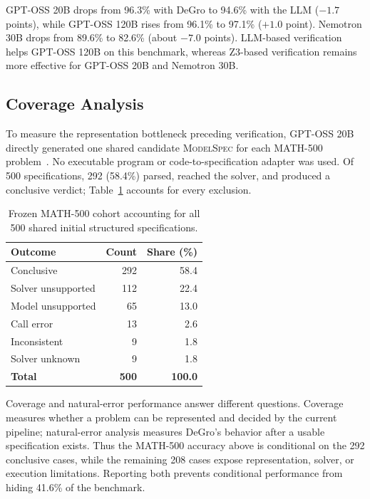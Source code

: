 \documentclass[sigconf,anonymous]{aamas}
\begin{document}
GPT-OSS 20B drops from 96.3\% with DeGro to 94.6\% with the LLM ($-1.7$ points), while GPT-OSS 120B rises from 96.1\% to 97.1\% ($+1.0$ point). Nemotron 30B drops from 89.6\% to 82.6\% (about $-7.0$ points). LLM-based verification helps GPT-OSS 120B on this benchmark, whereas Z3-based verification remains more effective for GPT-OSS 20B and Nemotron 30B.

\subsection{Coverage Analysis}\label{sec:coverage}
To measure the representation bottleneck preceding verification, GPT-OSS 20B directly generated one shared candidate \textsc{ModelSpec} for each MATH-500 problem~\cite{hendrycks2021math}.  No executable program or code-to-specification adapter was used.  Of 500 specifications, 292 (58.4\%) parsed, reached the solver, and produced a conclusive verdict; Table~\ref{tab:coverage} accounts for every exclusion.

\begin{table}[t]
\centering
\caption{Frozen MATH-500 cohort accounting for all 500 shared initial structured specifications.}
\label{tab:coverage}
\setlength{\tabcolsep}{8pt}
\renewcommand{\arraystretch}{1.05}
\begin{tabular}{lrr}
\toprule
\textbf{Outcome} & \textbf{Count} & \textbf{Share (\%)}\\
\midrule
Conclusive         & 292 & 58.4\\
Solver unsupported & 112 & 22.4\\
Model unsupported  & 65  & 13.0\\
Call error          & 13  & 2.6\\
Inconsistent        & 9   & 1.8\\
Solver unknown      & 9   & 1.8\\
\midrule
\textbf{Total}      & \textbf{500} & \textbf{100.0}\\
\bottomrule
\end{tabular}
\end{table}

Coverage and natural-error performance answer different questions. Coverage measures whether a problem can be represented and decided by the current pipeline; natural-error analysis measures DeGro's behavior after a usable specification exists. Thus the MATH-500 accuracy above is conditional on the 292 conclusive cases, while the remaining 208 cases expose representation, solver, or execution limitations. Reporting both prevents conditional performance from hiding 41.6\% of the benchmark.
\end{document}
